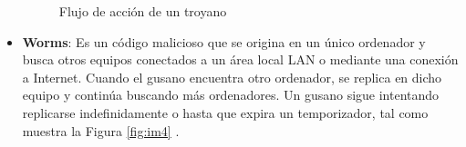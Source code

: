 \begin{itemize}
     \begin{figure}[htb!]
        \begin{center}
        \caption{Flujo de acción de un troyano}
        \label{fig:imtroyano}
        \end{center}
        \end{figure}
    
    
    
    \item \textbf{Worms}: Es un código malicioso que se origina en un único ordenador y busca otros equipos conectados a un área local \gls{LAN} o mediante una conexión a Internet. Cuando el gusano encuentra otro ordenador, se replica en dicho equipo y continúa buscando más ordenadores. Un gusano sigue intentando replicarse indefinidamente o hasta que expira un temporizador, tal como muestra la Figura \ref{fig:im4} \cite{trojan}.
    

\end{itemize}
